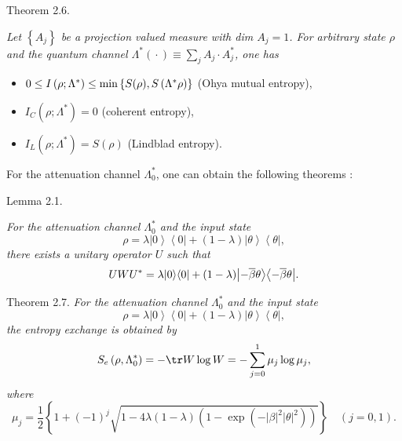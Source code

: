 \smallskip
{\small\sc Theorem 2.6.} {\it 
Let  $  \left\{ {A_{j}}\right\}  $   be a projection valued measure with dim $  %
A_{j}=1 $. For arbitrary state  $  \rho  $   and the quantum channel  $  \Lambda
^{\ast }\left( {}\cdot {}\right) \equiv \sum\nolimits_{j}A_{j}\cdot A_{j}^{\ast
}  $,   one has

\begin{itemize}

\item[ $  (1) $]    $  0\leq I\left( {\rho ;\Lambda ^{\ast }}\right) \leq \min \left\{ {%
S( \rho), S\left( {\Lambda ^{\ast }\rho }\right) }\right\}  $  %
(Ohya mutual entropy),

\item[ $  (2) $]    $  I_{C}\left( {\rho ;\Lambda ^{\ast }}\right) =0 $   (coherent entropy),

\item[ $  (3) $]    $  I_{L}\left( {\rho ;\Lambda ^{\ast }}\right) =S( \rho)  $  
(Lindblad entropy).

\end{itemize}
}

\smallskip

For the attenuation channel  $  \Lambda _{0}^{\ast } $,   one can obtain the
following theorems \cite{nv:-OW4}:

\smallskip
{\small \sc Lemma 2.1.}
{\it 
For  the  attenuation  channel $  \Lambda _{0}^{\ast }$  %
and  the  input  state%
\[
{\rho =\lambda {\left\vert 0\right\rangle }{\left\langle 0\right\vert }%
+(1-\lambda ){\left\vert \theta \right\rangle }{\left\langle \theta
\right\vert },} 
\]%
there  exists  a  unitary  operator $  U$  such  that%
\[
{UWU^{\ast }=\lambda {\left\vert 0\right\rangle }{\left\langle 0\right\vert }%
+(1-\lambda ){\left\vert-\overline{\beta }\theta \right\rangle }{%
\left\langle-\overline{\beta }\theta \right\vert }.} 
\]

}

\smallskip

{\small\sc Theorem 2.7.}
{\it 
For  the  attenuation  channel $  \Lambda _{0}^{\ast }
 $  and  the  input  state %
\[
{\rho =\lambda {\left\vert 0\right\rangle }{\left\langle 0\right\vert }%
+(1-\lambda ){\left\vert \theta \right\rangle }{\left\langle \theta
\right\vert },} 
\]%
the  entropy  exchange  is  obtained  by  %
\[
{S_{e}\left( \rho, \Lambda _{0}^{\ast }\right) =-\tr W\log
W=-\sum_{j=0}^{1}\mu _{j}\log \mu _{j},} 
\]%
where%
\[
{\mu _{j}=\frac{1}{2}\left\{ 1+\left(-1\right) ^{j}\sqrt{1-4\lambda \left(
1-\lambda \right) \left( 1-\exp \left(-\left\vert \beta \right\vert
^{2}\left\vert \theta \right\vert ^{2}\right) \right) }\right\} \quad \left(
j=0, 1\right).} 
\]
}


